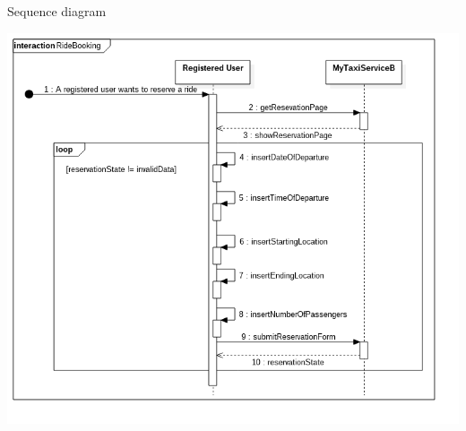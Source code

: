 \documentclass[11pt,titlepage]{article} %
\begin{document}
\begin{enumerate}
		Sequence diagram
		\begin{center}
		\includegraphics[scale=0.52]{usecase2.png}
		\end{center}
	

\end{enumerate}
\end{document}
